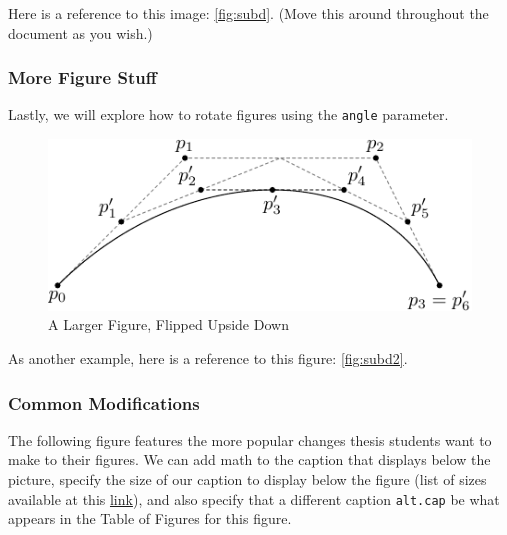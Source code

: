 \documentclass[12pt,twoside]{reedthesis}
\begin{document}
  Here is a reference to this image: \autoref{fig:subd}. (Move this around
  throughout the document as you wish.)
  
  \subsubsection{More Figure Stuff}\label{more-figure-stuff}
  
  Lastly, we will explore how to rotate figures using the \texttt{angle}
  parameter.
  
  \begin{Shaded}
  \begin{Highlighting}[]
  \NormalTok{(}\NormalTok{, }
        \NormalTok{, }
         \NormalTok{,}
         \NormalTok{,}
         \NormalTok{)}
  \end{Highlighting}
  \end{Shaded}
  
  \begin{figure}[h!tbp]
  \centering
  \includegraphics[angle = 180,scale = 1.5]{figure/subdivision.pdf}
  \caption[A Larger Figure, Flipped Upside Down]{\normalsize{A Larger Figure, Flipped Upside Down}}
  \label{fig:subd2}
  \end{figure}
  
  As another example, here is a reference to this figure:
  \autoref{fig:subd2}.
  
  \subsubsection{Common Modifications}\label{common-modifications}
  
  The following figure features the more popular changes thesis students
  want to make to their figures. We can add math to the caption that
  displays below the picture, specify the size of our caption to display
  below the figure (list of sizes available at this
  \href{http://www.emerson.emory.edu/services/latex/latex_169.html\#SEC169}{link}),
  and also specify that a different caption \texttt{alt.cap} be what
  appears in the Table of Figures for this figure.
  
\end{document}
